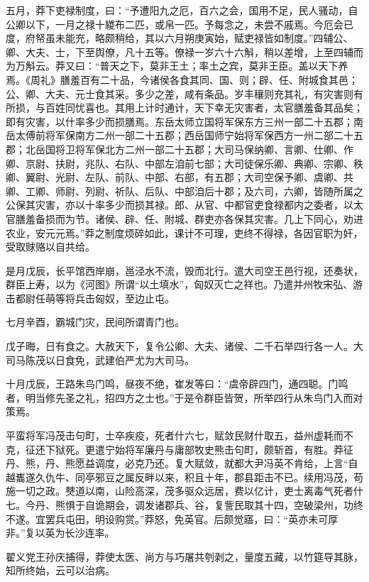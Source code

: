 \documentclass[]{article}
\begin{document}
五月，莽下吏禄制度，曰：``予遭阳九之厄，百六之会，国用不足，民人骚动，自公卿以下，一月之禄十緵布二匹，或帛一匹。予每念之，未尝不戚焉。今厄会已度，府帑虽未能充，略颇稍给，其以六月朔庚寅始，赋吏禄皆如制度。''四辅公、卿、大夫、士，下至舆僚，凡十五等。僚禄一岁六十六斛，稍以差增，上至四辅而为万斛云。莽又曰：``普天之下，莫非王土；率土之宾，莫非王臣。盖以天下养焉。《周礼》膳羞百有二十品，今诸侯各食其同、国、则；辟、任、附城食其邑；公、卿、大夫、元士食其采。多少之差，咸有条品。岁丰穰则充其礼，有灾害则有所损，与百姓同忧喜也。其用上计时通计，天下幸无灾害者，太官膳羞备其品矣；即有灾害，以什率多少而损膳焉。东岳太师立国将军保东方三州一部二十五郡；南岳太傅前将军保南方二州一部二十五郡；西岳国师宁始将军保西方一州二部二十五郡；北岳国将卫将军保北方二州一部二十五郡；大司马保纳卿、言卿、仕卿、作卿、京尉、扶尉，兆队、右队、中部左洎前七部；大司徒保乐卿、典卿、宗卿、秩卿、翼尉、光尉、左队、前队、中部、右部，有五郡；大司空保予卿、虞卿、共卿、工卿、师尉、列尉、祈队、后队、中部洎后十郡；及六司，六卿，皆随所属之公保其灾害，亦以十率多少而损其禄。郎、从官、中都官吏食禄都内之委者，以太官膳羞备损而为节。诸侯、辟、任、附城、群吏亦各保其灾害。几上下同心，劝进农业，安元元焉。''莽之制度烦碎如此，课计不可理，吏终不得禄，各因官职为奸，受取赇赂以自共给。

是月戊辰，长平馆西岸崩，邕泾水不流，毁而北行。遣大司空王邑行视，还奏状，群臣上寿，以为《河图》所谓``以土填水''，匈奴灭亡之祥也。乃遣并州牧宋弘、游击都尉任萌等将兵击匈奴，至边止屯。

七月辛酉，霸城门灾，民间所谓青门也。

戊子晦，日有食之。大赦天下，复令公卿、大夫、诸侯、二千石举四行各一人。大司马陈茂以日食免，武建伯严尤为大司马。

十月戊辰，王路朱鸟门鸣，昼夜不绝，崔发等曰：``虞帝辟四门，通四聪。门鸣者，明当修先圣之礼，招四方之士也。''于是令群臣皆贺，所举四行从朱鸟门入而对策焉。

平蛮将军冯茂击句町，士卒疾疫，死者什六七，赋敛民财什取五，益州虚耗而不克，征还下狱死。更遣宁始将军廉丹与庸部牧史熊击句町，颇斩首，有胜。莽征丹、熊，丹、熊愿益调度，必克乃还。复大赋敛，就都大尹冯英不肯给，上言``自越巂遂久仇牛、同亭邪豆之属反畔以来，积且十年，郡县距击不已。续用冯茂，苟施一切之政。僰道以南，山险高深，茂多驱众远居，费以亿计，吏士离毒气死者什七。今丹、熊惧于自诡期会，调发诸郡兵、谷，复訾民取其十四，空破梁州，功终不遂。宜罢兵屯田，明设购赏。''莽怒，免英官。后颇觉寤，曰：``英亦未可厚非。''复以英为长沙连率。

翟义党王孙庆捕得，莽使太医、尚方与巧屠共刳剥之，量度五藏，以竹筵导其脉，知所终始，云可以治病。
\end{document}
